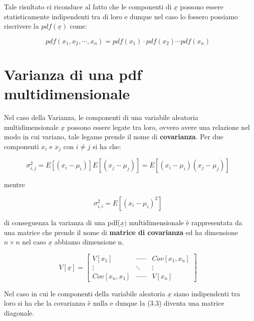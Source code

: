 \documentclass[11pt,a4paper]{book}
\begin{document}
\noindent Tale risultato ci riconduce al fatto che le componenti di $\underline{x}$ possono essere statisticamente indipendenti tra di loro e dunque nel caso lo fossero possiamo riscrivere la $pdf(\underline{x})$ come:

\begin{equation}
	pdf(x_1,x_2,\cdots,x_n) = pdf(x_1)\cdot pdf(x_2) \cdots pdf(x_n)
\end{equation}



\section{Varianza di una pdf multidimensionale}

Nel caso della Varianza, le componenti di una variabile aleatoria multidimensionale $\underline{x}$ possono essere legate tra loro, ovvero avere una relazione nel modo in cui variano, tale legame prende il nome di \textbf{covarianza}. Per due componenti $x_i$ e $x_j$ con $i \neq j$ si ha che: 

\begin{equation}
	\sigma_{i,j}^2= E[(x_i - \mu_i)]E[(x_j - \mu_j)] = E[(x_i - \mu_i)(x_j - \mu_j)]
\end{equation}  	

\noindent mentre   	

\begin{equation}
	\sigma_{i,i}^2 = E[(x_i-\mu_i)^2]
\end{equation}
 
\noindent di conseguenza la varianza di una pdf($\underline{x})$ multidimensionale \`{e} rappresentata da una matrice che prende il nome di \textbf{matrice di covarianza} ed ha dimensione $n \times n$ nel caso $\underline{x}$ abbiamo dimensione n.

\begin{equation}
	V[\underline{x}] = \begin{bmatrix}
		V[x_1] & \cdots \cdots	& Cov[x_1,x_n] \\
		\vdots & \ddots & \vdots \\
		Cov[x_n,x_1] & \cdots \cdots & V[x_n]
	\end{bmatrix}
\end{equation}
\newline

\noindent Nel caso in cui le componenti della variabile aleatoria $\underline{x}$ siano indipendenti tra loro si ha che la covarianza \`{e} nulla e dunque la (3.3) diventa una matrice diagonale.
\end{document}
